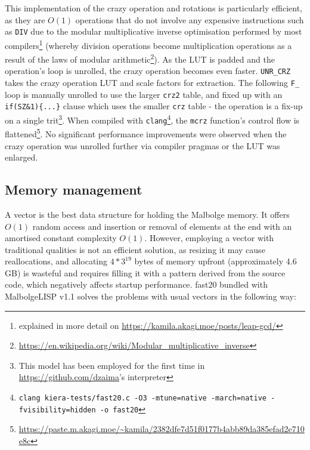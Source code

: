 \par This implementation of the crazy operation and rotations is particularly efficient, as they are $O(1)$ operations that do not involve any expensive instructions such as \verb|DIV| due to the modular multiplicative inverse optimisation performed by most compilers\footnote{explained in more detail on \url{https://kamila.akagi.moe/posts/leap-gcd/}} (whereby division operations become multiplication operations as a result of the laws of modular arithmetic\footnote{\url{https://en.wikipedia.org/wiki/Modular_multiplicative_inverse}}). As the LUT is padded and the operation's loop is unrolled, the crazy operation becomes even faster. \verb|UNR_CRZ| takes the crazy operation LUT and scale factors for extraction. The following \verb|F_| loop is manually unrolled to use the larger \verb|crz2| table, and fixed up with an \verb|if(SZ&1){...}| clause which uses the smaller \verb|crz| table - the operation is a fix-up on a single trit\footnote{This model has been employed for the first time in \url{https://github.com/dzaima}'s interpreter}. When compiled with \verb|clang|\footnote{\verb|clang kiera-tests/fast20.c -O3 -mtune=native -march=native -fvisibility=hidden -o fast20|}, the \verb|mcrz| function's control flow is flattened\footnote{\url{https://paste.m.akagi.moe/~kamila/2382dfe7d51f0177b4abb89da385efad2e710e8c}}. No significant performance improvements were observed when the crazy operation was unrolled further via compiler pragmas or the LUT was enlarged.

\subsection{Memory management}

\par A vector is the best data structure for holding the Malbolge memory. It offers $O(1)$ random access and insertion or removal of elements at the end with an amortised constant complexity $O(1)$. However, employing a vector with traditional qualities is not an efficient solution, as resizing it may cause reallocations, and allocating $4 * 3^{19}$ bytes of memory upfront (approximately 4.6 GB) is wasteful and requires filling it with a pattern derived from the source code, which negatively affects startup performance. fast20 bundled with MalbolgeLISP v1.1 solves the problems with usual vectors in the following way:

